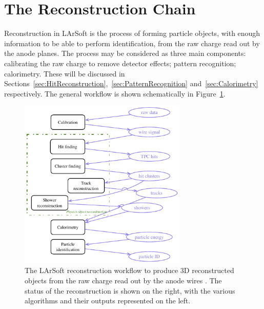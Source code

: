 \section{The Reconstruction Chain}\label{sec:ReconstructionChain}

Reconstruction in LArSoft is the process of forming particle objects, with enough information to be able to perform identification, from the raw charge read out by the anode planes.  The process may be considered as three main components: calibrating the raw charge to remove detector effects; pattern recognition; calorimetry.  These will be discussed in Sections~\ref{sec:HitReconstruction},~\ref{sec:PatternRecognition} and~\ref{sec:Calorimetry} respectively.  The general workflow is shown schematically in Figure~\ref{fig:ReconstructionWorkflow}.

\begin{figure}
  \centering
  \includegraphics[width=8cm]{ReconstructionWorkflow.pdf}
  \caption[The LArSoft reconstruction workflow to produce 3D reconstructed objects from the raw charge read out by the anode wires.]{The LArSoft reconstruction workflow to produce 3D reconstructed objects from the raw charge read out by the anode wires \cite{LArSoft2016}.  The status of the reconstruction is shown on the right, with the various algorithms and their outputs represented on the left.}
  \label{fig:ReconstructionWorkflow}
\end{figure}

